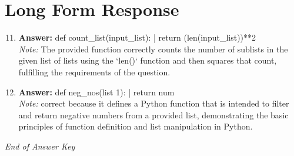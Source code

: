 \documentclass[12pt]{article}
\begin{document}
\section*{Long Form Response}
\begin{enumerate}[label=\arabic*.]
\setcounter{enumi}{10}
\item \textbf{Answer:} def count\_list(input\_list): | return (len(input\_list))**2
\\ \textit{Note:} The provided function correctly counts the number of sublists in the given list of lists using the `len()` function and then squares that count, fulfilling the requirements of the question.
\item \textbf{Answer:} def neg\_nos(list 1): | return num
\\ \textit{Note:} correct because it defines a Python function that is intended to filter and return negative numbers from a provided list, demonstrating the basic principles of function definition and list manipulation in Python.
\end{enumerate}

\vfill
\noindent\textit{End of Answer Key}
\end{document}
